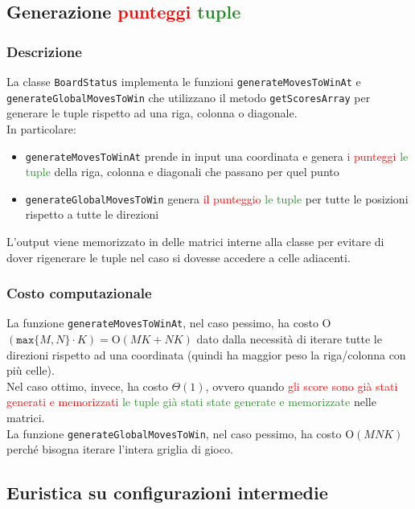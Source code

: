 \documentclass[11pt]{article}
\begin{document}
\subsection*{Generazione \textcolor{red}{punteggi} \textcolor{ForestGreen}{tuple}}
\subsubsection*{Descrizione}
La classe \texttt{BoardStatus} implementa le funzioni \texttt{generateMovesToWinAt} e \texttt{generateGlobalMovesToWin} che utilizzano il metodo \texttt{getScoresArray} per generare le tuple rispetto ad una riga, colonna o diagonale.\\
In particolare: 
\begin{itemize}
\setlength\itemsep{0.05cm}
	\item \texttt{generateMovesToWinAt} prende in input una coordinata e genera \textcolor{red}{i punteggi} \textcolor{ForestGreen}{le tuple} della riga, colonna e diagonali che passano per quel punto
	\item \texttt{generateGlobalMovesToWin} genera \textcolor{red}{il punteggio} \textcolor{ForestGreen}{le tuple} per tutte le posizioni rispetto a tutte le direzioni
\end{itemize}
L'output viene memorizzato in delle matrici interne alla classe per evitare di dover rigenerare le tuple nel caso si dovesse accedere a celle adiacenti.
\subsubsection*{Costo computazionale}
La funzione \texttt{generateMovesToWinAt}, nel caso pessimo, ha costo O$(\texttt{max}\{M, N\} \cdot K) = \text{O}(MK+NK)$ dato dalla necessità di iterare tutte le direzioni rispetto ad una coordinata (quindi ha maggior peso la riga/colonna con più celle).\\
Nel caso ottimo, invece, ha costo $\Theta(1)$, ovvero quando \textcolor{red}{gli score sono già stati generati e memorizzati} \textcolor{ForestGreen}{le tuple già stati state generate e memorizzate} nelle matrici.\\
La funzione \texttt{generateGlobalMovesToWin}, nel caso pessimo, ha costo O$(MNK)$ perché bisogna iterare l'intera griglia di gioco.

\subsection*{Euristica su configurazioni intermedie}
\end{document}
